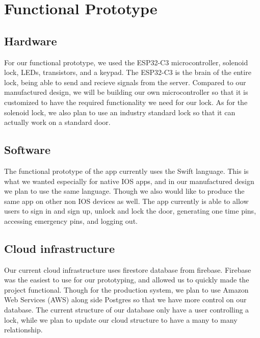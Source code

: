 \newpage %
\section{Functional Prototype}


\subsection{Hardware}

For our functional prototype, we used the ESP32-C3 microcontroller, solenoid lock, LEDs, transistors, and a keypad. The ESP32-C3 is the brain of the entire lock, being able to send and recieve signals from the server. Compared to our manufactured design, we will be building our own microcontroller so that it is customized to have the required functionality we need for our lock. As for the solenoid lock, we also plan to use an industry standard lock so that it can actually work on a standard door. 

\subsection{Software}

The functional prototype of the app currently uses the Swift language. This is what we wanted especially for native IOS apps, and in our manufactured design we plan to use the same language. Though we also would like to produce the same app on other non IOS devices as well. The app currently is able to allow users to sign in and sign up, unlock and lock the door, generating one time pins, accessing emergency pins, and logging out. 

\subsection{Cloud infrastructure}

Our current cloud infrastructure uses firestore database from firebase. Firebase was the easiest to use for our prototyping, and allowed us to quickly made the project functional. Though for the production system, we plan to use Amazon Web Services (AWS) along side Postgres so that we have more control on our database.  The current structure of our database only have a user controlling a lock, while we plan to update our cloud structure to have a many to many relationship. 

